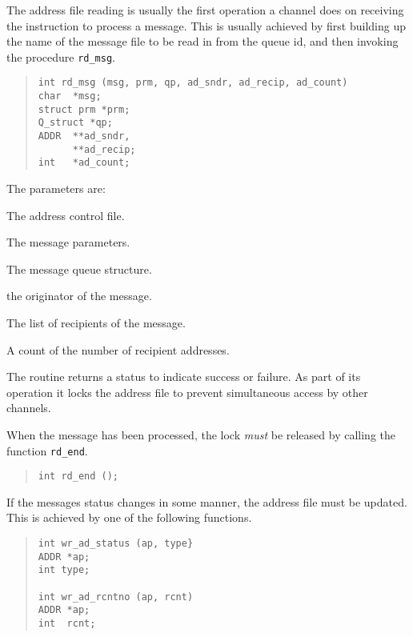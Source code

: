 The address file reading is usually the first operation a channel does
on receiving the instruction to process a message. This is usually
achieved by first building up the name of the message file to be read
in from the queue id, and then invoking the procedure \verb|rd_msg|.
\begin{quote}\begin{verbatim}
int rd_msg (msg, prm, qp, ad_sndr, ad_recip, ad_count)
char  *msg;
struct prm *prm;
Q_struct *qp;
ADDR  **ad_sndr,
      **ad_recip;
int   *ad_count;
\end{verbatim}\end{quote}
The parameters are:
\begin{describe}
\item[\verb|msg|:] The address control file.

\item[\verb|prm|:] The message parameters.

\item[\verb|qp|:] The message queue structure.

\item[\verb|ad\_sndr|:] the originator of the message.

\item[\verb|ad\_recip|:] The list of recipients of the message.

\item[\verb|ad\_count|:] A count of the number of recipient addresses.
\end{describe}

The routine returns a status to indicate success or failure. As part
of its operation it locks the address file to prevent simultaneous
access by other channels.

When the message has been processed, the lock {\em must} be released
by calling the function \verb|rd_end|.
\begin{quote}\begin{verbatim}
int rd_end ();
\end{verbatim}\end{quote}

If the messages status changes in some manner, the address file must
be updated. This is achieved by one of the following functions.
\begin{quote}\begin{verbatim}
int wr_ad_status (ap, type}
ADDR *ap;
int type;

int wr_ad_rcntno (ap, rcnt)
ADDR *ap;
int  rcnt;
\end{verbatim}\end{quote}

